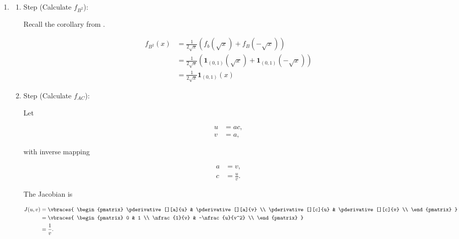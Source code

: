 \begin{solution}

\phantom{}

\begin{enumerate}[label = (\alph*)]

    \item

    \begin{enumerate}[label = \arabic*.]

        \item Step (Calculate $f_{B^2}$):
        
        Recall the corollary from \cite[Lecture 3, Slide 42]{EStat}.

        \begin{align*}
            f_{B^2}(x)
            & =
            \frac{1}{2 \sqrt x}
            (
                f_b(\sqrt x) + f_B(-\sqrt x)
            ) \\
            & =
            \frac{1}{2 \sqrt x}
            (
                \mathbf 1_{(0, 1)}(\sqrt x) + \mathbf 1_{(0, 1)}(-\sqrt x)
            ) \\
            & =
            \frac{1}{2 \sqrt x}
            \mathbf 1_{(0, 1)}(x)
        \end{align*}

        \item Step (Calculate $f_{A C}$):
        
        Let

        \begin{align*}
            u & = ac, \\
            v & = a,
        \end{align*}

        with inverse mapping

        \begin{align*}
            a & = v, \\
            c & = \frac{u}{v}.
        \end{align*}

        The Jacobian is

        \begin{align*}
            J(u, v)
            & =
            \vbraces
            {
                \begin{pmatrix}
                    \pderivative[][a]{u} & \pderivative[][a]{v} \\
                    \pderivative[][c]{u} & \pderivative[][c]{v} \\
                \end{pmatrix}
            } \\
            & =
            \vbraces
            {
                \begin{pmatrix}
                    0            & 1               \\
                    \nfrac{1}{v} & -\nfrac{u}{v^2} \\
                \end{pmatrix}
            } \\
            & =
            \frac{1}{v}.
        \end{align*}


\end{enumerate}
\end{enumerate}
\end{solution}
